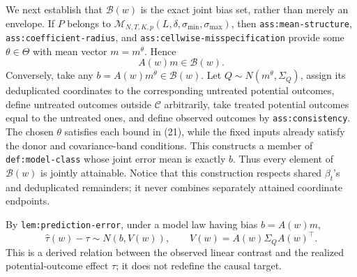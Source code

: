 We next establish that \(\mathcal B(w)\) is the exact joint bias set, rather
than merely an envelope.  If \(P\) belongs to
\(\mathcal M_{N,T,K,p}(L,\delta,\sigma_{\min},\sigma_{\max})\), then
\texttt{ass:mean-structure}, \texttt{ass:coefficient-radius}, and
\texttt{ass:cellwise-misspecification} provide some \(\theta\in\Theta\)
with mean vector \(m=m^\theta\).  Hence
\[
 A(w)m\in\mathcal B(w). \tag{26}
\]
Conversely, take any \(b=A(w)m^\theta\in\mathcal B(w)\).  Let
\(Q\sim N(m^\theta,\Sigma_Q)\), assign its deduplicated coordinates to the
corresponding untreated potential outcomes, define untreated outcomes outside
\(\mathcal C\) arbitrarily, take treated potential outcomes equal to the
untreated ones, and define observed outcomes by
\texttt{ass:consistency}.  The chosen \(\theta\) satisfies each bound in
(21), while the fixed inputs already satisfy the donor and covariance-band
conditions.  This constructs a member of \texttt{def:model-class} whose
joint error mean is exactly \(b\).  Thus every element of \(\mathcal B(w)\)
is jointly attainable.  Notice that this construction respects shared
\(\beta_t\)'s and deduplicated remainders; it never combines separately
attained coordinate endpoints.

By \texttt{lem:prediction-error}, under a model law having bias
\(b=A(w)m\),
\[
 \widehat\tau(w)-\tau\sim
 N\!\left(b,V(w)\right),
 \qquad V(w)=A(w)\Sigma_QA(w)^{\top}. \tag{27}
\]
This is a derived relation between the observed linear contrast and the
realized potential-outcome effect \(\tau\); it does not redefine the causal
target.

